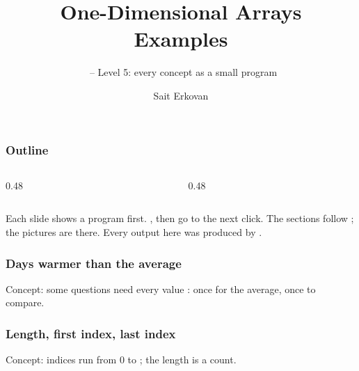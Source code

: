 \documentclass[aspectratio=169,10pt,compress]{beamer}
\title[Arrays 1D: Examples]{
	One-Dimensional Arrays\\
	Examples
}
\subtitle{
	\cisOOO\ -- Level 5: every concept as a small program
}
\author[Erkovan]{Sait Erkovan}
\institute[FCIS]{
	Faculty of Computer and Information Sciences\\
	Yeditepe University
}
\date{{\tiny \hbTimeStamp}}
\begin{document}
\begin{frame}[t,fragile]
	\titlepage
\end{frame}




\begin{frame}[t,fragile] \frametitle{Outline}
	\begin{columns}[T]
		\begin{column}{0.48\textwidth}
			\tableofcontents[sections={1-4}, hideallsubsections]
		\end{column}
		\begin{column}{0.48\textwidth}
			\tableofcontents[sections={5-8}, hideallsubsections]
		\end{column}
	\end{columns}

	\vspace{1em}
	\small Each slide shows a program first. , then go to the next
	click. The sections follow ; the pictures are there.
	Every output here was produced by .
\end{frame}








\begin{frame}[t,fragile] \frametitle{Days warmer than the average}

	\footnotesize Concept: some questions need every value : once for the average,
	once to compare.
\end{frame}








\begin{frame}[t,fragile] \frametitle{Length, first index, last index}

	\small Concept: indices run from 0 to ; the length is a count.
\end{frame}
\end{document}
